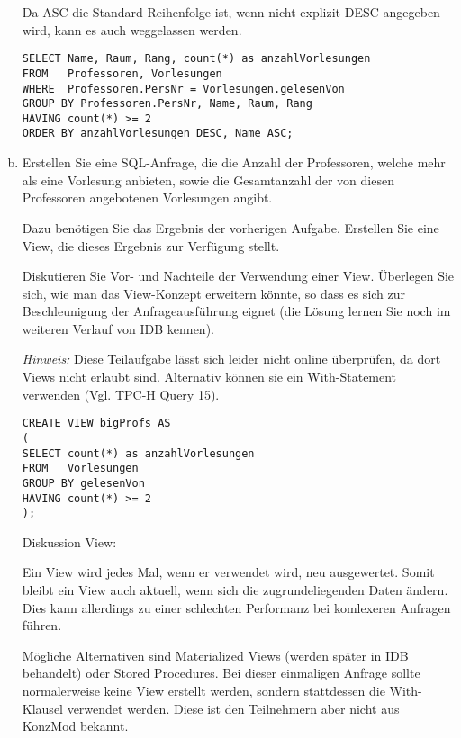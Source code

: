 \begin{normalText}
\begin{enumerate}[a)]
\begin{note}
	Da ASC die Standard-Reihenfolge ist, wenn nicht explizit DESC angegeben wird, kann es auch weggelassen werden.

	\begin{lstlisting}
SELECT Name, Raum, Rang, count(*) as anzahlVorlesungen
FROM   Professoren, Vorlesungen
WHERE  Professoren.PersNr = Vorlesungen.gelesenVon
GROUP BY Professoren.PersNr, Name, Raum, Rang
HAVING count(*) >= 2
ORDER BY anzahlVorlesungen DESC, Name ASC;
	\end{lstlisting}
	\end{note}


	\item Erstellen Sie eine SQL-Anfrage, die die Anzahl der Professoren, welche mehr als eine Vorlesung anbieten, sowie die Gesamtanzahl der von diesen Professoren angebotenen Vorlesungen angibt.

	Dazu benötigen Sie das Ergebnis der vorherigen Aufgabe.
	Erstellen Sie eine View, die dieses Ergebnis zur Verfügung stellt.

	Diskutieren Sie Vor- und Nachteile der Verwendung einer View.
	Überlegen Sie sich, wie man das View-Konzept erweitern könnte, so dass es sich zur Beschleunigung der Anfrageausführung eignet (die Lösung lernen Sie noch im weiteren Verlauf von IDB kennen).
	
	\textit{Hinweis:} Diese Teilaufgabe lässt sich leider nicht online überprüfen, da dort Views nicht erlaubt sind. Alternativ können sie ein With-Statement verwenden (Vgl. TPC-H Query 15).

\cprotEnv
	\begin{note}
	\begin{lstlisting}
CREATE VIEW bigProfs AS
(
SELECT count(*) as anzahlVorlesungen
FROM   Vorlesungen
GROUP BY gelesenVon
HAVING count(*) >= 2
);
	\end{lstlisting}

	Diskussion View:

	Ein View wird jedes Mal, wenn er verwendet wird, neu ausgewertet.
	Somit bleibt ein View auch aktuell, wenn sich die zugrundeliegenden Daten ändern.
	Dies kann allerdings zu einer schlechten Performanz bei komlexeren Anfragen führen.

	Mögliche Alternativen sind Materialized Views (werden später in IDB behandelt) oder Stored Procedures.
	Bei dieser einmaligen Anfrage sollte normalerweise keine View erstellt werden, sondern stattdessen die With-Klausel verwendet werden.
	Diese ist den Teilnehmern aber nicht aus KonzMod bekannt.


\end{note}
\end{enumerate}
\end{normalText}
